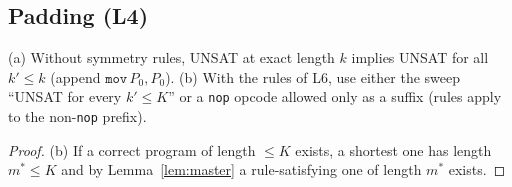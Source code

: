 \subsection{Padding (L4)}
\begin{lemma}[L4] (a) Without symmetry rules, UNSAT at exact length $k$ implies UNSAT for all $k'\le k$
(append $\texttt{mov}\,P_0,P_0$). (b) With the rules of L6, use either the sweep ``UNSAT for every $k'\le K$'' or a
\texttt{nop} opcode allowed only as a suffix (rules apply to the non-\texttt{nop} prefix).
\end{lemma}
\begin{proof} (b) If a correct program of length $\le K$ exists, a shortest one has length $m^\ast\le K$ and by
Lemma~\ref{lem:master} a rule-satisfying one of length $m^\ast$ exists. \end{proof}

